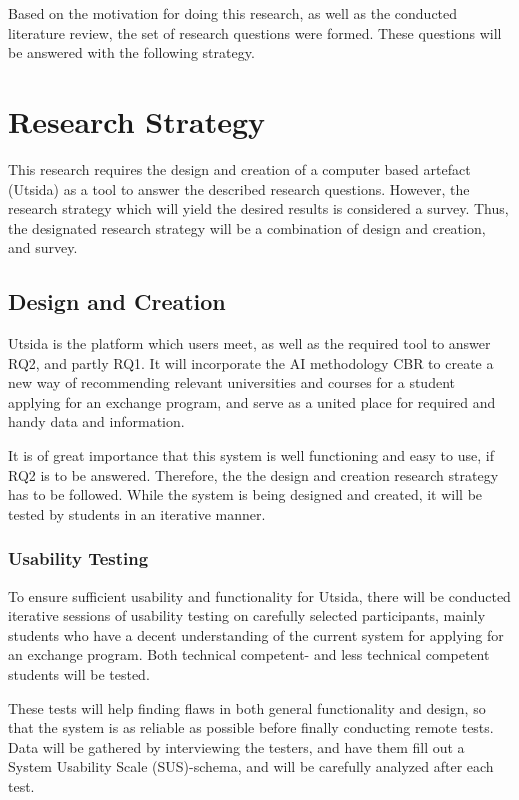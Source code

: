 Based on the motivation for doing this research, as well as the conducted literature review, the set of research questions were formed. These questions will be answered with the following strategy.

\section{Research Strategy}

This research requires the design and creation of a computer based artefact (Utsida) as a tool to answer the described research questions. However, the research strategy which will yield the desired results is considered a survey. Thus, the designated research strategy will be a combination of design and creation, and survey. 

\subsection{Design and Creation}

Utsida is the platform which users meet, as well as the required tool to answer RQ2, and partly RQ1. It will incorporate the AI methodology CBR to create a new way of recommending relevant universities and courses for a student applying for an exchange program, and serve as a united place for required and handy data and information. 

It is of great importance that this system is well functioning and easy to use, if RQ2 is to be answered. Therefore, the the design and creation research strategy has to be followed. While the system is being designed and created, it will be tested by students in an iterative manner.

\subsubsection{Usability Testing}

To ensure sufficient usability and functionality for Utsida, there will be conducted iterative sessions of usability testing on carefully selected participants, mainly students who have a decent understanding of the current system for applying for an exchange program. Both technical competent- and less technical competent students will be tested.

These tests will help finding flaws in both general functionality and design, so that the system is as reliable as possible before finally conducting remote tests. Data will be gathered by interviewing the testers, and have them fill out a System Usability Scale (SUS)-schema\cite{brooke1996sus}, and will be carefully analyzed after each test.





